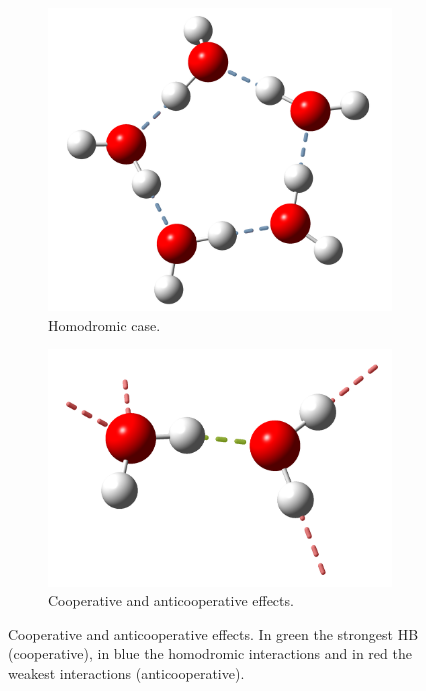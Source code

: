 \begin{figure}[h]
\centering
\begin{subfigure}[b]{0.43\linewidth}
\includegraphics[width=\linewidth]{2/img/pentamero}
\caption{Homodromic case.}
\label{pentamero}
\end{subfigure}
\begin{subfigure}[b]{0.43\linewidth}
\includegraphics[width=\linewidth]{2/img/dimero_b}
\caption{Cooperative and anticooperative effects.}
\label{coo_anti}
\end{subfigure}
\caption{Cooperative and anticooperative effects. In green the strongest HB (cooperative), in blue the homodromic interactions and
in red the weakest interactions (anticooperative).}
\label{fig_coop}
\end{figure}

